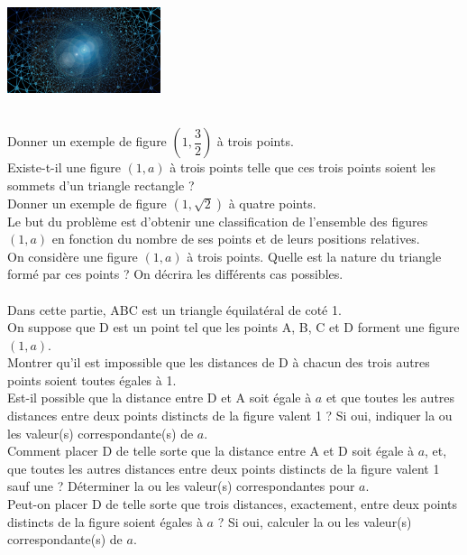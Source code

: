 \documentclass[a4paper,10pt,exos]{nsi}
\begin{document}
    \maketitle

    {\includegraphics[width=4.5cm]{polygons.jpg}}

    {\titlefont\color{UGLiBlue}{Partie A}}\\
    \question Donner un exemple de figure $\left(1,\dfrac{3}{2}\right)$ à trois points.\\[.5em]
    \question Existe-t-il une figure $(1, a)$ à trois points telle que ces trois points soient les sommets d’un triangle rectangle ?\\[.5em]
    \question Donner un exemple de figure $\left(1, \sqrt{2} \right)$ à quatre points.\\

    Le but du problème est d’obtenir une classification de l’ensemble des figures $(1, a)$ en fonction du nombre de ses points et de leurs positions relatives.\\

    \question On considère une figure $(1, a)$ à trois points. Quelle est la nature du triangle formé par ces points ? On décrira les différents cas possibles.\\

    {\titlefont\color{UGLiBlue}{Partie B}}\\
    Dans cette partie, ABC est un triangle équilatéral de coté 1.\\
    On suppose que D est un point tel que les points A, B, C et D forment une figure $(1, a)$.\\[.5em]
    \question Montrer qu’il est impossible que les distances de D à chacun des trois autres points soient toutes égales à 1.\\[.5em]
    \question Est-il possible que la distance entre D et A soit égale à $a$ et que toutes les autres distances entre deux points distincts de la figure valent 1 ? Si oui, indiquer la ou les valeur(s) correspondante(s) de $a$.\\[.5em]
    \question Comment placer D de telle sorte que la distance entre A et D soit égale à $a$, et, que toutes les autres distances entre deux points distincts de la figure valent 1 sauf une ? Déterminer la ou les valeur(s) correspondantes pour $a$.\\[.5em]
    \question Peut-on placer D de telle sorte que trois distances, exactement, entre deux points distincts de la figure soient égales à $a$ ? Si oui, calculer la ou les valeur(s) correspondante(s) de $a$.\\
\end{document}
